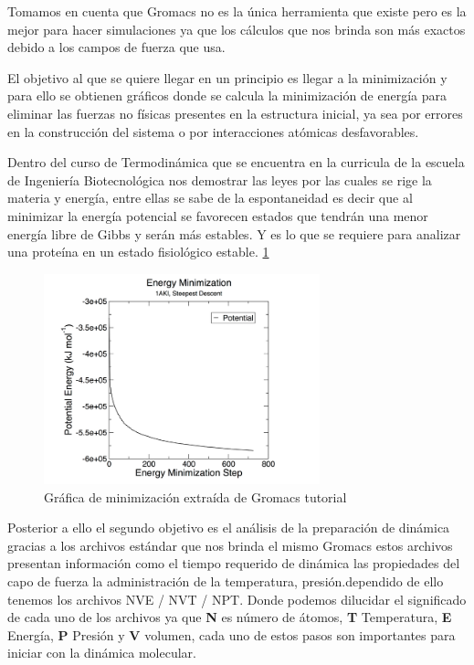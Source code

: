 \documentclass[a4paper,12pt]{article}
\begin{document}
         Tomamos en cuenta que Gromacs no es la única herramienta que existe pero es la mejor para hacer simulaciones ya que los cálculos que nos brinda son más exactos debido a los campos de fuerza que usa.

         El objetivo al que se quiere llegar en un principio es llegar a la minimización y para ello se obtienen gráficos donde se calcula la minimización de energía para eliminar las fuerzas no físicas presentes en la estructura inicial, ya sea por errores en la construcción del sistema o por interacciones atómicas desfavorables.

         Dentro del curso de Termodinámica que se encuentra en la curricula de la escuela de Ingeniería Biotecnológica nos demostrar las leyes por las cuales se rige la materia y energía, entre ellas se sabe de la espontaneidad es decir que al minimizar la energía potencial se favorecen estados que tendrán una menor energía libre de Gibbs y serán más estables. Y es lo que se requiere para analizar una proteína en un estado fisiológico estable. \ref{Mini}
         
         \begin{figure}[H]
            \centering
            \includegraphics[width=8cm]{img/Captura desde 2024-09-26 18-01-02.png}
            \caption{Gráfica de minimización extraída de Gromacs tutorial}
            \label{Mini}
         \end{figure}

         Posterior a ello el segundo objetivo es el análisis de la preparación de dinámica gracias a los archivos estándar que nos brinda el mismo Gromacs estos archivos presentan información como el tiempo requerido de dinámica las propiedades del capo de fuerza la administración de la temperatura, presión.dependido de ello tenemos los archivos NVE / NVT / NPT. Donde podemos dilucidar el significado de cada uno de los archivos ya que \textbf{N} es número de átomos, \textbf{T} Temperatura, \textbf{E} Energía, \textbf{P} Presión y \textbf{V} volumen, cada uno de estos pasos son importantes para iniciar con la dinámica molecular.
\end{document}
